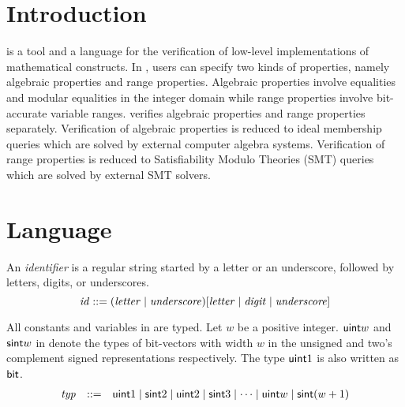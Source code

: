 \documentclass{article}
\begin{document}
\title{\cryptoline}
\date{\today}
\maketitle

\section{Introduction}

\cryptoline is a tool and a language for the verification of low-level
implementations of mathematical constructs.
In \cryptoline, users can specify two kinds of properties,
namely algebraic properties and range properties.
Algebraic properties involve equalities and modular equalities in the
integer domain while range properties involve bit-accurate variable
ranges.
\cryptoline verifies algebraic properties and range properties
separately.
Verification of algebraic properties is reduced to ideal membership
queries which are solved by external computer algebra systems.
Verification of range properties is reduced to Satisfiability Modulo
Theories (SMT) queries which are solved by external SMT solvers.

\section{\cryptoline Language}

An \emph{identifier} is a regular string started by a letter or an
underscore, followed by letters, digits, or underscores.
\[
\mathit{id} ::= (\mathit{letter} \mid \mathit{underscore}) [ \mathit{letter} \mid \mathit{digit} \mid \mathit{underscore} ]
\]

All constants and variables in \cryptoline are typed.
Let $w$ be a positive integer.
$\mathsf{uint} w$ and $\mathsf{sint} w$ in \cryptoline denote the types of bit-vectors
with width $w$ in the unsigned and two's complement signed
representations respectively.
The type $\mathsf{uint} 1$ is also written as $\mathsf{bit}$.
\[
  \begin{array}{rcl}
    \mathit{typ} & ::= & \mathsf{uint} 1 \mid \mathsf{sint} 2 \mid \mathsf{uint} 2 \mid \mathsf{sint} 3 \mid
                \cdots \mid \mathsf{uint} w \mid \mathsf{sint} (w+1)
  \end{array}
\]
\end{document}

